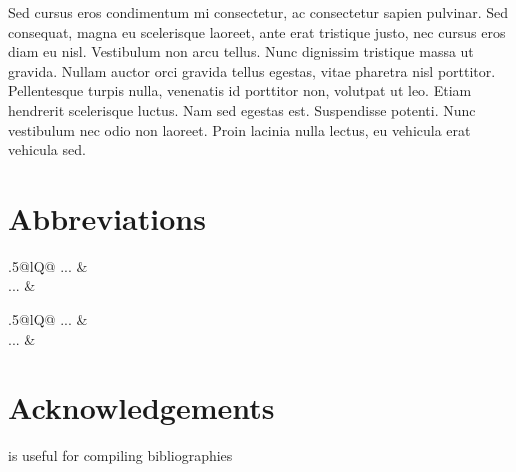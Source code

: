\documentclass[output=paper,colorlinks,citecolor=brown
]{langscibook}
\begin{document}
Sed cursus eros condimentum mi consectetur, ac consectetur sapien pulvinar. Sed consequat, magna eu scelerisque laoreet, ante erat tristique justo, nec cursus eros diam eu nisl. Vestibulum non arcu tellus. Nunc dignissim tristique massa ut gravida. Nullam auctor orci gravida tellus egestas, vitae pharetra nisl porttitor. Pellentesque turpis nulla, venenatis id porttitor non, volutpat ut leo. Etiam hendrerit scelerisque luctus. Nam sed egestas est. Suspendisse potenti. Nunc vestibulum nec odio non laoreet. Proin lacinia nulla lectus, eu vehicula erat vehicula sed.


\section*{Abbreviations}
\begin{tabularx}{.5\textwidth}{@{}lQ@{}}
... & \\
... & \\
\end{tabularx}%
\begin{tabularx}{.5\textwidth}{@{}lQ@{}}
... & \\
... & \\
\end{tabularx}

\section*{Acknowledgements}
\citet{Nordhoff2018} is useful for compiling bibliographies

\sloppy
\printbibliography[heading=subbibliography,notkeyword=this]
\end{document}

